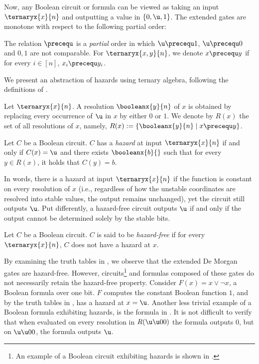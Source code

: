 \documentclass[acmsmall, nonacm, authorversion]{acmart}
\begin{document}
Now, any Boolean circuit or formula can be viewed as taking an input $\ternaryx{x}{n}$ and outputting a value in $\{0,\u,1\}$. The extended gates are monotone with respect to the following partial order:
\begin{definition}\label{def:bit-relations-precequ}
The relation $\precequ$ is a \emph{partial} order in which $\u \precequ 1$, $\u \precequ 0$ and $0,1$ are not comparable.
For $\ternaryx{x,y}{n}$, we denote  $x \precequ y$ if for every $i\in[n]$, $x_i \precequ y_i$.
\end{definition}

We present an abstraction of hazards using ternary algebra, following the definitions of \cite{FFL18,IKL+19}.

\begin{definition}[Resolution]\label{def:resolution} Let $\ternaryx{x}{n}$.
A resolution $\booleanx{y}{n}$ of $x$ is obtained by replacing every occurrence of $\u$ in $x$ by either $0$ or $1$. We denote by $R(x)$ the set of all resolutions of $x$, namely, $R(x):=\{\booleanx{y}{n} \mid x\precequ y\}$.
\end{definition}

\begin{definition}[Hazard]\label{def:hazard} 
Let $C$ be a Boolean circuit. $C$ has a \emph{hazard} at input $\ternaryx{x}{n}$ if and only if $C(x)=\u$ and there exists $\booleanx{b}{}$ such that for every $y \in R(x)$, it holds that $C(y)=b$.
\end{definition}

In words, there is a hazard at input $\ternaryx{x}{n}$ if the function is constant on every resolution of $x$ (i.e., regardless of how the unstable coordinates are resolved into stable values, the output remains unchanged), yet the circuit still outputs $\u$.
Put differently, a hazard-free circuit outputs $\u$ if and only if the output cannot be determined solely by the stable bits.

\begin{definition}\label{def:hazard-free} 
Let $C$ be a Boolean circuit. $C$ is said to be \emph{hazard-free} if for every $\ternaryx{x}{n}$, $C$ does not have a hazard at $x$.
\end{definition}

By examining the truth tables in , we observe that the extended De Morgan gates are hazard-free. However, circuits\footnote{An example of a Boolean circuit exhibiting hazards is shown in \cite[Figure 1]{IKL+19}.} and formulas composed of these gates do not necessarily retain the hazard-free property. Consider $F(x)=x\lor \neg x$, a Boolean formula over one bit. $F$ computes the constant Boolean function $1$, and by the truth tables in , has a hazard at $x=\u$. 
Another less trivial example of a Boolean formula exhibiting hazards, is the formula in . It is not difficult to verify that when evaluated on every resolution in $R(\u\u 00)$ the formula outputs $0$, but on $\u\u 00$, the formula outputs $\u$.
\end{document}
